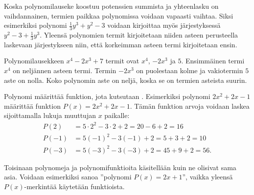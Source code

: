 Koska polynomilauseke koostuu potenssien summista ja yhteenlasku on vaihdannainen, termien paikkaa polynomissa voidaan vapaasti vaihtaa. Siksi esimerkiksi polynomi $\frac{1}{3}y^3+y^2-3$ voidaan kirjoittaa myös järjestyksessä $y^2-3+\frac{1}{3}y^3$. Yleensä polynomien termit kirjoitetaan niiden asteen perusteella laskevaan järjestykseen niin, että korkeimman asteen termi kirjoitetaan ensin.

\begin{esimerkki}
Polynomilausekkeen $x^4-2x^3+7$ termit ovat $x^4$, $-2x^3$ ja $5$.
Ensimmäinen termi $x^4$ on neljännen asteen termi. Termin $-2x^3$ on puolestaan kolme ja vakiotermin $5$ aste on nolla.
Koko polynomin aste on neljä, koska se on termien asteista suurin.
\end{esimerkki}



Polynomi määrittää funktion, jota kutsutaan . Esimerkiksi polynomi $2x^2+2x-1$ määrittää funktion $P(x)=2x^2+2x-1$. Tämän funktion arvoja voidaan laskea sijoittamalla lukuja muuttujan $x$ paikalle:
\begin{align*}
P(2) & = 5\cdot 2^2-3\cdot 2+2 = 20 - 6 + 2 = 16 \\
P(-1) & = 5(-1)^2-3(-1)+2 = 5 + 3 + 2 = 10 \\
P(-3) & = 5(-3)^2-3(-3)+2 = 45 + 9 + 2 = 56.
\end{align*}

Toisinaan polynomeja ja polynomifunktioita käsitellään kuin ne olisivat sama asia.
Voidaan esimerkiksi sanoa ''polynomi $P(x)=2x+1$'', vaikka yleensä $P(x)$-merkintää käytetään funktioista.


